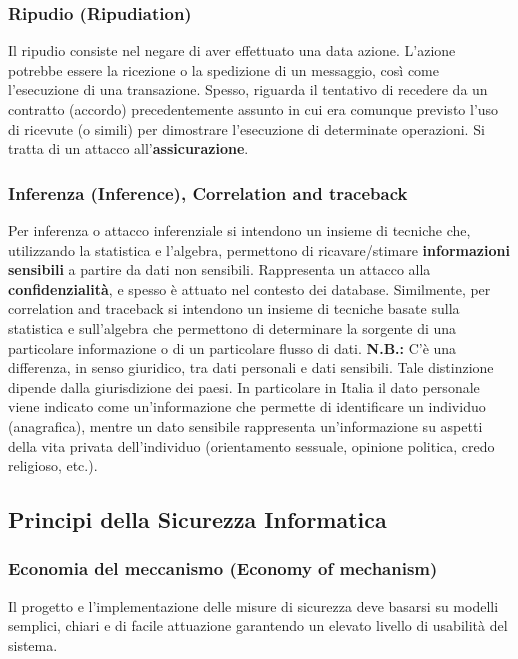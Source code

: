 \subsubsection{Ripudio (Ripudiation)}
Il ripudio consiste nel negare di aver effettuato una data azione. L'azione potrebbe essere la ricezione o la spedizione di un messaggio, così come l'esecuzione di una transazione. Spesso, riguarda il tentativo di recedere da un contratto (accordo) precedentemente assunto in cui era comunque previsto l'uso di ricevute (o simili) per dimostrare l'esecuzione di determinate operazioni. Si tratta di un attacco all'\textbf{assicurazione}.

\subsubsection{Inferenza (Inference), Correlation and traceback}
Per inferenza o attacco inferenziale si intendono un insieme di tecniche che, utilizzando la statistica e l'algebra, permettono di ricavare/stimare \textbf{informazioni sensibili} a partire da dati non sensibili. Rappresenta un attacco alla \textbf{confidenzialità}, e spesso è attuato nel contesto dei database. Similmente, per correlation and traceback si intendono un insieme di tecniche basate sulla statistica e sull'algebra che permettono di determinare la sorgente di una particolare informazione o di un particolare flusso di dati.\newline \newline
\textbf{N.B.:} C'è una differenza, in senso giuridico, tra dati personali e dati sensibili. Tale distinzione dipende dalla giurisdizione dei paesi. In particolare in Italia il dato personale viene indicato come un'informazione che permette di identificare un individuo (anagrafica), mentre un dato sensibile rappresenta un'informazione su aspetti della vita privata dell'individuo (orientamento sessuale, opinione politica, credo religioso, etc.).

\subsection{Principi della Sicurezza Informatica}

\subsubsection{Economia del meccanismo (Economy of mechanism)}
Il progetto e l'implementazione delle misure di sicurezza deve basarsi su modelli semplici, chiari e di facile attuazione garantendo un elevato livello di usabilità del sistema.

